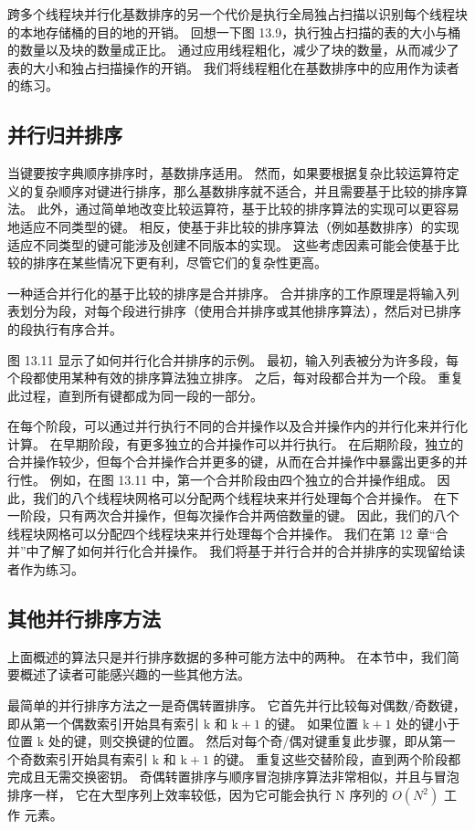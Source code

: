 跨多个线程块并行化基数排序的另一个代价是执行全局独占扫描以识别每个线程块的本地存储桶的目的地的开销。 
回想一下图 13.9，执行独占扫描的表的大小与桶的数量以及块的数量成正比。 
通过应用线程粗化，减少了块的数量，从而减少了表的大小和独占扫描操作的开销。 我们将线程粗化在基数排序中的应用作为读者的练习。

\subsection{并行归并排序}
当键要按字典顺序排序时，基数排序适用。 
然而，如果要根据复杂比较运算符定义的复杂顺序对键进行排序，那么基数排序就不适合，并且需要基于比较的排序算法。 
此外，通过简单地改变比较运算符，基于比较的排序算法的实现可以更容易地适应不同类型的键。 
相反，使基于非比较的排序算法（例如基数排序）的实现适应不同类型的键可能涉及创建不同版本的实现。 
这些考虑因素可能会使基于比较的排序在某些情况下更有利，尽管它们的复杂性更高。

一种适合并行化的基于比较的排序是合并排序。 
合并排序的工作原理是将输入列表划分为段，对每个段进行排序（使用合并排序或其他排序算法），然后对已排序的段执行有序合并。

图 13.11 显示了如何并行化合并排序的示例。 最初，输入列表被分为许多段，每个段都使用某种有效的排序算法独立排序。 
之后，每对段都合并为一个段。 重复此过程，直到所有键都成为同一段的一部分。

在每个阶段，可以通过并行执行不同的合并操作以及合并操作内的并行化来并行化计算。 
在早期阶段，有更多独立的合并操作可以并行执行。 
在后期阶段，独立的合并操作较少，但每个合并操作合并更多的键，从而在合并操作中暴露出更多的并行性。 
例如，在图 13.11 中，第一个合并阶段由四个独立的合并操作组成。 
因此，我们的八个线程块网格可以分配两个线程块来并行处理每个合并操作。 
在下一阶段，只有两次合并操作，但每次操作合并两倍数量的键。 
因此，我们的八个线程块网格可以分配四个线程块来并行处理每个合并操作。 我们在第 12 章“合并”中了解了如何并行化合并操作。 
我们将基于并行合并的合并排序的实现留给读者作为练习。

\subsection{其他并行排序方法}
上面概述的算法只是并行排序数据的多种可能方法中的两种。 在本节中，我们简要概述了读者可能感兴趣的一些其他方法。

最简单的并行排序方法之一是奇偶转置排序。 它首先并行比较每对偶数/奇数键，
即从第一个偶数索引开始具有索引 $\mathrm{k}$ 和 $\mathrm{k}+1$ 的键。 
如果位置 $\mathrm{k}+1$ 处的键小于位置 $\mathrm{k}$ 处的键，则交换键的位置。 
然后对每个奇/偶对键重复此步骤，即从第一个奇数索引开始具有索引 $\mathrm{k}$ 和 $\mathrm{k}+1$ 的键。 
重复这些交替阶段，直到两个阶段都完成且无需交换密钥。 
奇偶转置排序与顺序冒泡排序算法非常相似，并且与冒泡排序一样，
它在大型序列上效率较低，因为它可能会执行 N 序列的 $O\left(N^{2}\right)$ 工作  元素。

